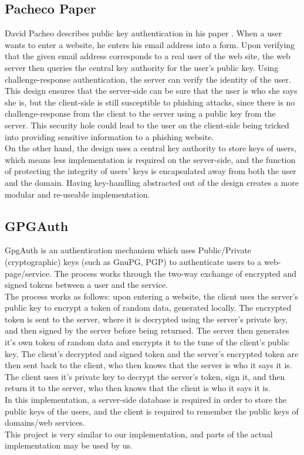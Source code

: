 \documentclass[11pt]{article}
\begin{document}
\subsection{Pacheco Paper}
David Pacheo describes public key authentication in his paper \cite{pacheco}. When a user wants to enter a website, he enters his email address into a form. Upon verifying that the given email address corresponds to a real user of the web site, the web server then queries the central key authority for the user's public key. Using challenge-response authentication, the server can verify the identity of the user.\\
	This design ensures that the server-side can be sure that the user is who she says she is, but the client-side is still susceptible to phishing attacks, since there is no challenge-response from the client to the server using a public key from the server.  This security hole could lead to the user on the client-side being tricked into providing sensitive information to a phishing website.\\
	On the other hand, the design uses a central key authority to store keys of users, which means less implementation is required on the server-side, and the function of protecting the integrity of users' keys is encapsulated away from both the user and the domain.  Having key-handling abstracted out of the design creates a more modular and re-useable implementation.\\

\subsection{GPGAuth}
GpgAuth\cite{gpgauth} is an authentication mechanism which uses Public/Private (cryptographic) keys (such as GnuPG, PGP) to authenticate users to a web-page/service.  The process works through the two-way exchange of encrypted and signed tokens between a user and the service.\\
	The process works as follows: upon entering a website, the client uses the server's public key to encrypt a token of random data, generated locally.  The encrypted token is sent to the server, where it is decrypted using the server's private key, and then signed by the server before being returned.  The server then generates it's own token of random data and encrypts it to the tune of the client's public key.  The client's decrypted and signed token  and the server's encrypted token are then sent back to the client, who then knows that the server is who it says it is.  The client uses it's private key to decrypt the server's token, sign it, and then return it to the server, who then knows that the client is who it says it is.\\
	In this implementation, a server-side database is required in order to store the public keys of the users, and the client is required to remember the public keys of domains/web services.\\
	This project is very similar to our implementation, and parts of the actual implementation may be used by us.


{}
\end{document}
